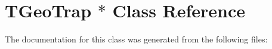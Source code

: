 \hypertarget{class_t_geo_trap_01_5}{}\section{T\+Geo\+Trap $\ast$ Class Reference}
\label{class_t_geo_trap_01_5}


The documentation for this class was generated from the following files\+: